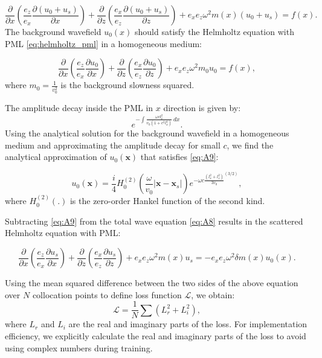 \documentclass[authoryear, preprint, 12pt]{elsarticle}
\begin{document}
		\begin{equation}
			\frac{\partial}{\partial x} \left( \frac{e_z}{e_x} \frac{\partial (u_0 + u_s)}{\partial x} \right) +
			\frac{\partial}{\partial z} \left( \frac{e_x}{e_z} \frac{\partial (u_0 + u_s)}{\partial z} \right) +
			e_x e_z \omega^2 m(x) (u_0 + u_s) = f(x).
			\label{eq:A8}
		\end{equation}
	The background wavefield \( u_0(x) \) should satisfy the Helmholtz equation with PML \eqref{eq:helmholtz_pml} in a homogeneous medium:
		
		\begin{equation}
			\frac{\partial}{\partial x} \left( \frac{e_z}{e_x} \frac{\partial u_0}{\partial x} \right) +
			\frac{\partial}{\partial z} \left( \frac{e_x}{e_z} \frac{\partial u_0}{\partial z} \right) +
			e_x e_z \omega^2 m_0 u_0 = f(x),
				\label{eq:A9}
		\end{equation}
where \( m_0 = \frac{1}{v_0^2} \) is the background slowness squared.
		
The amplitude decay inside the PML in $x$ direction is given by:
\begin{equation}
	e^{-\int \frac{\omega c l_x^2}{v_0 (1 + c^2 l_x^4)} \, dx}.
\end{equation}
Using the analytical solution for the background wavefield in a homogeneous medium and approximating the amplitude decay for small $c$, we find the analytical approximation of $u_0(\mathbf{x})$ that satisfies \eqref{eq:A9}:

	\begin{equation}
u_0(\mathbf{x}) = \frac{i}{4} H_0^{(2)}\left(\frac{\omega}{v_0}  |\mathbf{x} - \mathbf{x}_s|\right) e^{-\omega c \frac{(l_x^2+l_z^2)}{3 v_0}^{(3/2)}},
	\end{equation}
where $H_0^{(2)}\left(.\right)$ is the zero-order Hankel function of the second kind.

Subtracting  \eqref{eq:A9}  from the total wave equation  \eqref{eq:A8} results in the scattered Helmholtz equation with PML:
		
		\begin{equation}
			\frac{\partial}{\partial x} \left( \frac{e_z}{e_x} \frac{\partial u_s}{\partial x} \right) +
			\frac{\partial}{\partial z} \left( \frac{e_x}{e_z} \frac{\partial u_s}{\partial z} \right) +
			e_x e_z \omega^2 m(x) u_s = - e_x e_z \omega^2 \delta m(x) u_0(x).
			\label{eq:scattered_helmholtz_pml}
		\end{equation}
		
	
	Using the mean squared difference between the two sides of the above equation over $N$ collocation points to define loss function $\mathcal{L}$, we obtain:
	\begin{equation}
		\mathcal{L} = \frac{1}{N} \sum \left( {L}_r^2 + {L}_i^2 \right),
	\end{equation}
	where ${L}_r$ and ${L}_i$ are the real and imaginary parts of the loss. For implementation efficiency, we explicitly calculate the real and imaginary parts of the loss to avoid using complex numbers during training. 
	
\end{document}
